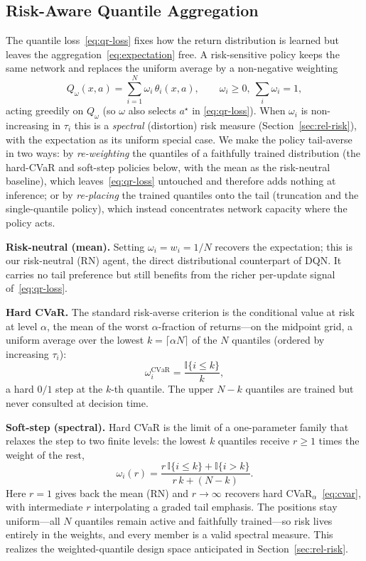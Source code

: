 \documentclass[conference]{IEEEtran}
\begin{document}
\subsection{Risk-Aware Quantile Aggregation}
\label{sec:method-risk}
The quantile loss~\eqref{eq:qr-loss} fixes how the return distribution is
learned but leaves the aggregation~\eqref{eq:expectation} free. A risk-sensitive
policy keeps the same network and replaces the uniform average by a non-negative
weighting
\begin{equation}
Q_\omega(x,a) = \sum_{i=1}^{N}\omega_i\,\theta_i(x,a),
\qquad \omega_i\ge 0,\ \textstyle\sum_i\omega_i = 1,
\label{eq:risk-agg}
\end{equation}
acting greedily on $Q_\omega$ (so $\omega$ also selects $a^\star$ in
\eqref{eq:qr-loss}). When $\omega_i$ is non-increasing in $\tau_i$ this is a
\emph{spectral} (distortion) risk measure (Section~\ref{sec:rel-risk}), with the
expectation as its uniform special case. We make the policy tail-averse in two
ways: by \emph{re-weighting} the quantiles of a faithfully trained distribution
(the hard-CVaR and soft-step policies below, with the mean as the risk-neutral
baseline), which leaves~\eqref{eq:qr-loss} untouched and therefore adds nothing at
inference; or by \emph{re-placing} the trained quantiles onto the tail (truncation
and the single-quantile policy), which instead concentrates network capacity where
the policy acts.

\textbf{Risk-neutral (mean).} Setting $\omega_i=w_i=1/N$ recovers the
expectation; this is our risk-neutral (RN) agent, the direct distributional
counterpart of DQN. It carries no tail preference but still benefits from the
richer per-update signal of~\eqref{eq:qr-loss}.

\textbf{Hard CVaR.} The standard risk-averse criterion is the conditional value
at risk at level $\alpha$, the mean of the worst $\alpha$-fraction of returns---on
the midpoint grid, a uniform average over the lowest $k=\lceil\alpha N\rceil$ of
the $N$ quantiles (ordered by increasing $\tau_i$):
\begin{equation}
\omega_i^{\mathrm{CVaR}} = \frac{\mathbb{I}\{i\le k\}}{k},
\label{eq:cvar}
\end{equation}
a hard $0/1$ step at the $k$-th quantile. The upper $N-k$ quantiles are
trained but never consulted at decision time.

\textbf{Soft-step (spectral).} Hard CVaR is the limit of a one-parameter family
that relaxes the step to two finite levels: the lowest $k$ quantiles receive
$r\ge 1$ times the weight of the rest,
\begin{equation}
\omega_i(r) =
\frac{r\,\mathbb{I}\{i\le k\} + \mathbb{I}\{i>k\}}{r\,k + (N-k)} .
\label{eq:softstep}
\end{equation}
Here $r{=}1$ gives back the mean (RN) and $r\to\infty$ recovers hard
CVaR$_\alpha$~\eqref{eq:cvar}, with intermediate $r$ interpolating a graded tail
emphasis. The positions stay uniform---all $N$ quantiles remain active and
faithfully trained---so risk lives entirely in the weights, and every member is a
valid spectral measure. This realizes the weighted-quantile design space
anticipated in Section~\ref{sec:rel-risk}.
\end{document}
